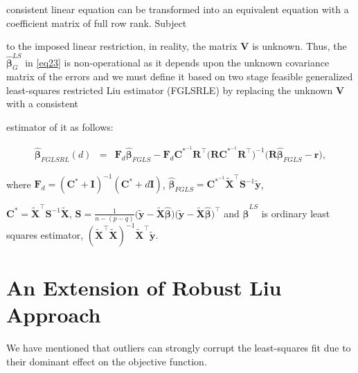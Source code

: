 \documentclass[10pt,twoside]{article}
\numberwithin{equation}{section}
\begin{document}
consistent linear equation can be transformed into an equivalent equation with a coefficient matrix of full row rank. Subject

to the imposed linear restriction, in reality, the matrix $\boldsymbol V$ is unknown. Thus, the $\hat{\boldsymbol\beta}_G^{LS}$ in \eqref{eq23} is non-operational as it depends upon the unknown covariance matrix of the errors and we must define it based on two stage feasible generalized least-squares restricted Liu estimator (FGLSRLE) by replacing the unknown $\boldsymbol V$ with a consistent

estimator of it as follows:

\begin{eqnarray}\label{eq25}

\hat{\boldsymbol\beta}_{FGLSRL}(d)&=&\boldsymbol F_d\hat{\boldsymbol\beta}_{FGLS}-\boldsymbol F_d\boldsymbol C^{*^{-1}}\boldsymbol R^\top\big(\boldsymbol R\boldsymbol C^{*^{-1}}\boldsymbol R^{\top}\big)^{-1}\big(\boldsymbol R\hat{\boldsymbol\beta}_{FGLS}-\boldsymbol r\big),

\end{eqnarray}

where $\boldsymbol F_d=(\boldsymbol C^{*}+\boldsymbol I)^{-1}(\boldsymbol C^{*}+d\boldsymbol I)$, $\hat{\boldsymbol\beta}_{FGLS}=\boldsymbol C^{*^{-1}}\widetilde{\boldsymbol X}^\top\boldsymbol S^{-1}\widetilde{\boldsymbol y}$,

$\boldsymbol C^*=\widetilde{\boldsymbol X}^\top\boldsymbol S^{-1}\widetilde{\boldsymbol X}$, $\boldsymbol S=\frac{1}{n-(p-q)}\big(\widetilde{\boldsymbol y}-\widetilde{\boldsymbol X}\hat{\boldsymbol\beta}\big)\big(\widetilde{\boldsymbol y}-\widetilde{\boldsymbol X} \hat{\boldsymbol\beta}\big)^\top$ and $\hat{\boldsymbol\beta}^{LS}$ is ordinary least squares estimator, $(\widetilde{\boldsymbol X}^\top\widetilde{\boldsymbol X})^{-1}\widetilde{\boldsymbol X}^\top\widetilde{\boldsymbol y}$.






\section{An Extension of Robust Liu Approach}



We have mentioned that outliers can strongly corrupt the least-squares fit due to their dominant effect on the objective function.
\end{document}
